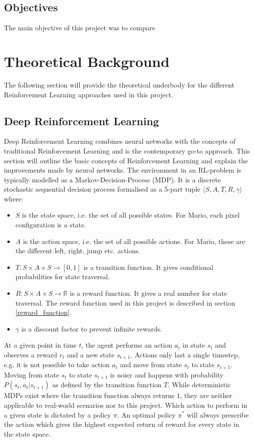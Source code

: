 \documentclass[notitlepage,a4paper,11pt]{article}
\newcommand{\R}{\mathbb{R}}
\begin{document}
\subsection{Objectives}
The main objective of this project was to compare 

\section{Theoretical Background}
The following section will provide the theoretical underbody for the different Reinforcement Learning approaches used in this project. 


\subsection{Deep Reinforcement Learning}
Deep Reinforcement Learning combines neural networks with the concepts of traditional Reinforcement Learning and is the contemporary go-to approach. This section will outline the basic concepts of Reinforcement Learning and explain the improvements made by neural networks. The environment in an RL-problem is typically modelled as a Markov-Decision-Process (MDP). It is a discrete stochastic sequential decision process \cite{puterman2014markov} formalised as a 5-part tuple $\langle S, A, T, R, \gamma \rangle$ where:

\begin{itemize}[noitemsep]
	\item $S$ is the state space, i.e. the set of all possible states. For Mario, each pixel configuration is a state.
	\item $A$ is the action space, i.e. the set of all possible actions. For Mario, these are the different left, right, jump etc. actions.
	\item $T : S \times A \times S \to [0,1]$ is a transition function. It gives conditional probabilities for state traversal.
	\item $R : S \times A \times S \to \R$ is a reward function. It gives a real number for state traversal. The reward function used in this project is described in section \ref{reward_function}.
	\item $\gamma$ is a discount factor to prevent infinite rewards.
\end{itemize}

At a given point in time $t$, the agent performs an action $a_t$ in state $s_t$ and observes a reward $r_t$ and a new state $s_{t+1}$. Actions only last a single timestep, e.g. it is not possible to take action $a_t$ and move from state $s_t$ to state $s_{t+5}$. Moving from state $s_t$ to state $s_{t+1}$ is noisy and happens with probability $P(s_t, a_t | s_{t+1})$ as defined by the transition function $T$. While deterministic MDPs exist where the transition function always returns $1$, they are neither applicable to real-world scenarios nor to this project. Which action to perform in a given state is dictated by a policy $\pi$. An optimal policy $\pi^*$ will always prescribe the action which gives the highest expected return of reward for every state in the state space.
\end{document}
